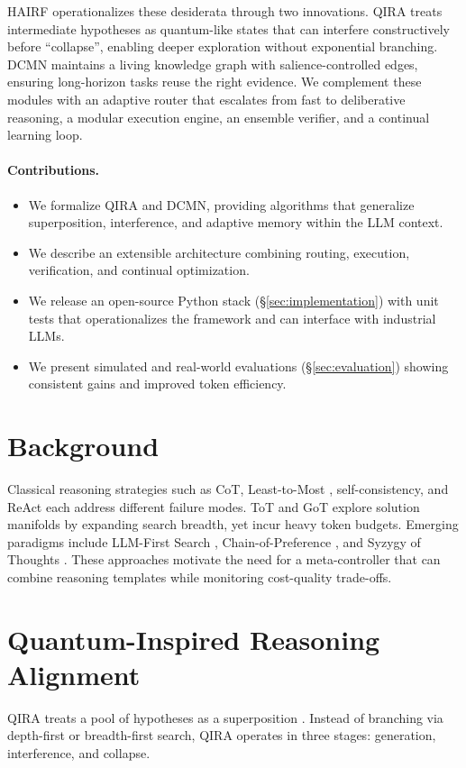 \documentclass[11pt]{article}
\begin{document}
HAIRF operationalizes these desiderata through two innovations.  QIRA treats intermediate hypotheses as quantum-like states that can interfere constructively before ``collapse'', enabling deeper exploration without exponential branching.  DCMN maintains a living knowledge graph with salience-controlled edges, ensuring long-horizon tasks reuse the right evidence.  We complement these modules with an adaptive router that escalates from fast to deliberative reasoning, a modular execution engine, an ensemble verifier, and a continual learning loop.

\paragraph{Contributions.}
\begin{itemize}[leftmargin=*]
    \item We formalize QIRA and DCMN, providing algorithms that generalize superposition, interference, and adaptive memory within the LLM context.
    \item We describe an extensible architecture combining routing, execution, verification, and continual optimization.
    \item We release an open-source Python stack (\S\ref{sec:implementation}) with unit tests that operationalizes the framework and can interface with industrial LLMs.
    \item We present simulated and real-world evaluations (\S\ref{sec:evaluation}) showing consistent gains and improved token efficiency.
\end{itemize}

\section{Background}
\label{sec:background}
Classical reasoning strategies such as CoT, Least-to-Most \citep{zhou2022least}, self-consistency, and ReAct each address different failure modes.  ToT and GoT explore solution manifolds by expanding search breadth, yet incur heavy token budgets.  Emerging paradigms include LLM-First Search \citep{herr2025llmfirst}, Chain-of-Preference \citep{li2024chain}, and Syzygy of Thoughts \citep{smith2025syzygy}.  These approaches motivate the need for a meta-controller that can combine reasoning templates while monitoring cost-quality trade-offs.

\section{Quantum-Inspired Reasoning Alignment}
\label{sec:qira}
QIRA treats a pool of hypotheses as a superposition \citep{yao2023tree}.  Instead of branching via depth-first or breadth-first search, QIRA operates in three stages: generation, interference, and collapse.
\end{document}
